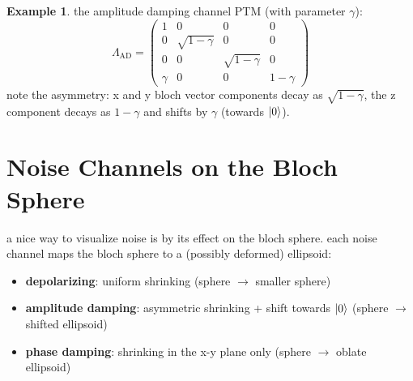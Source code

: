\documentclass[11pt,a4paper]{article}
\theoremstyle{definition}
\newtheorem{example}{Example}[section]
\theoremstyle{remark}
\begin{document}
\begin{example}
the amplitude damping channel PTM (with parameter $\gamma$):
\[
\Lambda_{\text{AD}} = \begin{pmatrix} 1 & 0 & 0 & 0 \\ 0 & \sqrt{1-\gamma} & 0 & 0 \\ 0 & 0 & \sqrt{1-\gamma} & 0 \\ \gamma & 0 & 0 & 1-\gamma \end{pmatrix}
\]
note the asymmetry: x and y bloch vector components decay as $\sqrt{1-\gamma}$, the z component decays as $1-\gamma$ and shifts by $\gamma$ (towards $\ket{0}$).
\end{example}

\section{Noise Channels on the Bloch Sphere}

a nice way to visualize noise is by its effect on the bloch sphere. each noise channel maps the bloch sphere to a (possibly deformed) ellipsoid:

\begin{center}
\end{center}

\begin{itemize}
    \item \textbf{depolarizing}: uniform shrinking (sphere $\to$ smaller sphere)
    \item \textbf{amplitude damping}: asymmetric shrinking + shift towards $\ket{0}$ (sphere $\to$ shifted ellipsoid)
    \item \textbf{phase damping}: shrinking in the x-y plane only (sphere $\to$ oblate ellipsoid)
\end{itemize}
\end{document}
